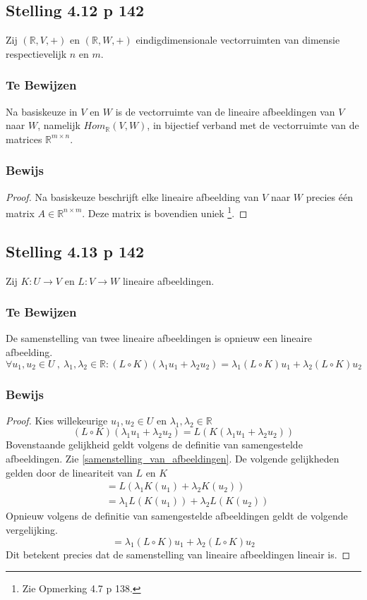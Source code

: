 \documentclass[lineaire_algebra_oplossingen.tex]{subfiles}
\begin{document}
\subsection{Stelling 4.12 p 142}
\label{4.12}
Zij $(\mathbb{R},V,+)$ en  $(\mathbb{R},W,+)$ eindigdimensionale vectorruimten van dimensie respectievelijk $n$ en $m$.
\subsubsection*{Te Bewijzen}
Na basiskeuze in $V$ en $W$ is de vectorruimte van de lineaire afbeeldingen van $V$ naar $W$, namelijk $\textit{Hom}_{\mathbb{R}}(V,W)$, in bijectief verband met de vectorruimte van de matrices $\mathbb{R}^{m\times n}$.
\subsubsection*{Bewijs}
\begin{proof}
Na basiskeuze beschrijft elke lineaire afbeelding van $V$ naar $W$ precies \'e\'en matrix $A\in \mathbb{R}^{n\times m}$. Deze matrix is bovendien uniek \footnote{Zie Opmerking 4.7 p 138.}.
\end{proof}

\subsection{Stelling 4.13 p 142}
\label{4.13}
Zij $K:U\rightarrow V$ en $L:V\rightarrow W$ lineaire afbeeldingen.
\subsubsection*{Te Bewijzen}
De samenstelling van twee lineaire afbeeldingen is opnieuw een lineaire afbeelding.
\[
\forall u_1,u_2\in U \ ,\ \lambda_1,\lambda_2\in\mathbb{R}: (L\circ K)(\lambda_1u_1 + \lambda_2u_2) = \lambda_1(L\circ K)u_1 + \lambda_2(L\circ K)u_2
\]
\subsubsection*{Bewijs}
\begin{proof}
Kies willekeurige $u_1,u_2\in U$ en $\lambda_1,\lambda_2\in\mathbb{R}$
\[
(L\circ K)(\lambda_1u_1 + \lambda_2u_2) = L(K(\lambda_1u_1 + \lambda_2u_2))
\]
Bovenstaande gelijkheid geldt volgens de definitie van samengestelde afbeeldingen. Zie \ref{samenstelling_van_afbeeldingen}. De volgende gelijkheden gelden door de lineariteit van $L$ en $K$
\begin{align*}
&= L(\lambda_1K(u_1) + \lambda_2K(u_2)) \\
&= \lambda_1L(K(u_1)) + \lambda_2L(K(u_2))
\end{align*}
Opnieuw volgens de definitie van samengestelde afbeeldingen geldt de volgende vergelijking.
\[
= \lambda_1(L\circ K)u_1 + \lambda_2(L\circ K)u_2
\]
Dit betekent precies dat de samenstelling van lineaire afbeeldingen lineair is.
\end{proof}
\end{document}

